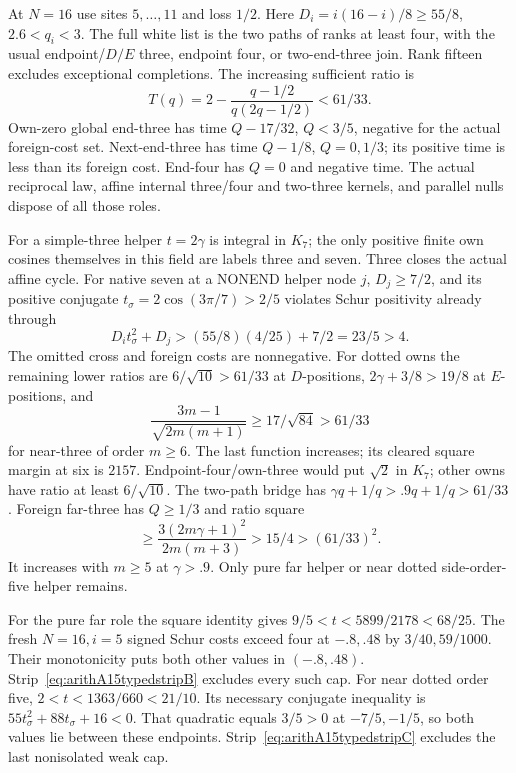 \documentclass[11pt]{article}
\begin{document}
At \(N=16\) use sites \(5,\ldots,11\)
and loss \(1/2\).
Here \(D_i=i(16-i)/8\ge55/8\), \(2.6<q_i<3\).
The full white list is the two paths
of ranks at least four, with the usual
endpoint/\(D/E\) three, endpoint four,
or two-end-three join.
Rank fifteen excludes exceptional completions.
The increasing sufficient ratio is
\[
             T(q)=2-{\frac{q-1/2}{q(2q-1/2)}}<61/33 .
\]
Own-zero global end-three has time
\(Q-17/32\), \(Q<3/5\), negative for
the actual foreign-cost set.
Next-end-three has time \(Q-1/8\),
\(Q=0,1/3\); its positive time is
less than its foreign cost.
End-four has \(Q=0\) and negative time.
The actual reciprocal law, affine internal
three/four and two-three kernels, and
parallel nulls dispose of all those roles.

For a simple-three helper \(t=2\gamma\)
is integral in \(K_7\); the only positive
finite own cosines themselves in this
field are labels three and seven.
Three closes the actual affine cycle.
For native seven at a NONEND helper node
\(j\), \(D_j\ge7/2\), and its positive
conjugate \(t_\sigma=2\cos(3\pi/7)>2/5\)
violates Schur positivity already through
\[
                 D_it_\sigma^2+D_j>
                       (55/8)(4/25)+7/2=23/5>4 .
\]
The omitted cross and foreign costs are
nonnegative.
For dotted owns the remaining lower
ratios are \(6/\sqrt{10}>61/33\) at
\(D\)-positions, \(2\gamma+3/8>19/8\)
at \(E\)-positions, and
\[
 {\frac{3m-1}{\sqrt{2m(m+1)}}}\ge17/\sqrt{84}>61/33
\]
for near-three of order \(m\ge6\).
The last function increases; its cleared
square margin at six is \(2157\).
Endpoint-four/own-three would put
\(\sqrt2\) in \(K_7\); other owns have
ratio at least \(6/\sqrt{10}\).
The two-path bridge has
\(\gamma q+1/q>.9q+1/q>61/33\).
Foreign far-three has \(Q\ge1/3\)
and ratio square
\[
          \ge{\frac{3(2m\gamma+1)^2}{2m(m+3)}}
                         >15/4>(61/33)^2 .
\]
It increases with \(m\ge5\) at \(\gamma>.9\).
Only pure far helper or near dotted
side-order-five helper remains.

For the pure far role the square identity
gives \(9/5<t<5899/2178<68/25\).
The fresh \(N=16,i=5\) signed Schur
costs exceed four at \(-.8,.48\)
by \(3/40,59/1000\).
Their monotonicity puts both other values
in \((-.8,.48)\).
Strip~\eqref{eq:arithA15typedstripB}
excludes every such cap.
For near dotted order five,
\(2<t<1363/660<21/10\).
Its necessary conjugate inequality is
\(55t_\sigma^2+88t_\sigma+16<0\).
That quadratic equals \(3/5>0\) at
\(-7/5,-1/5\), so both values lie
between these endpoints.
Strip~\eqref{eq:arithA15typedstripC}
excludes the last nonisolated weak cap.
\end{document}
